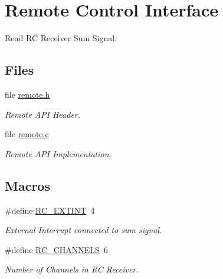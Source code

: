 \hypertarget{group__remote}{\section{Remote Control Interface}
\label{group__remote}
}


Read R\-C Receiver Sum Signal.  


\subsection*{Files}
\begin{DoxyCompactItemize}
\item 
file \hyperlink{remote_8h}{remote.\-h}
\begin{DoxyCompactList}\small\item\em Remote A\-P\-I Header. \end{DoxyCompactList}\item 
file \hyperlink{remote_8c}{remote.\-c}
\begin{DoxyCompactList}\small\item\em Remote A\-P\-I Implementation. \end{DoxyCompactList}\end{DoxyCompactItemize}
\subsection*{Macros}
\begin{DoxyCompactItemize}
\item 
\#define \hyperlink{group__remote_gaea99c3c3bfae9e9643e6f1b3f2885bf6}{R\-C\-\_\-\-E\-X\-T\-I\-N\-T}~4
\begin{DoxyCompactList}\small\item\em External Interrupt connected to sum signal. \end{DoxyCompactList}\item 
\#define \hyperlink{group__remote_gaad403df27c4671b0787f75525ee666ad}{R\-C\-\_\-\-C\-H\-A\-N\-N\-E\-L\-S}~6
\begin{DoxyCompactList}\small\item\em Number of Channels in R\-C Receiver. \end{DoxyCompactList}\end{DoxyCompactItemize}
